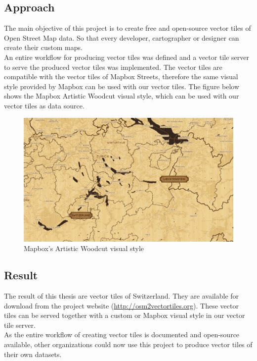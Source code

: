 \newpage
\subsection*{Approach}

The main objective of this project is to create free and open-source vector tiles of Open Street Map data. So that every developer, cartographer or designer can create their custom maps.\\ 
An entire workflow for producing vector tiles was defined and a vector tile server to serve the produced vector tiles was implemented. The vector tiles are compatible with the vector tiles of Mapbox Streets, therefore the same visual style provided by Mapbox can be used with our vector tiles. The figure below shows the Mapbox Artistic Woodcut visual style, which can be used with our vector tiles as data source.

\begin{figure}[H]
  \includegraphics[width=1\textwidth]{images/woodcut.png}
  \caption{Mapbox's Artistic Woodcut visual style}
\end{figure}

\subsection*{Result}
The result of this thesis are vector tiles of Switzerland. They are available for download from the project website (\url{http://osm2vectortiles.org}). These vector tiles can be served together with a custom or Mapbox visual style in our vector tile server.\\
As the entire workflow of creating vector tiles is documented and open-source available, other organizations could now use this project to produce vector tiles of their own datasets.
\endgroup

\vfill
